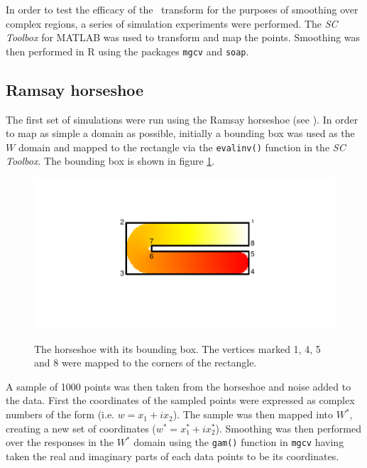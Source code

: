 In order to test the efficacy of the \sch\ transform for the purposes of smoothing over complex regions, a series of simulation experiments were performed. The \emph{SC Toolbox} for MATLAB was used to transform and map the points. Smoothing was then performed in \textsf{R} using the packages \texttt{mgcv} and \texttt{soap}.

\subsection{Ramsay horseshoe}

The first set of simulations were run using the Ramsay horseshoe (see ). In order to map as simple a domain as possible, initially a bounding box was used as the $W$ domain and mapped  to the rectangle via the \texttt{evalinv()} function in the \emph{SC Toolbox}. The bounding box is shown in figure \ref{hswithboundingbox}.

\begin{figure}
\centering
\includegraphics[trim=0.5in 1in 0in 0.5in]{sc/figs/hswithboundingbox.pdf} \\
\caption{The horseshoe with its bounding box. The vertices marked 1, 4, 5 and 8 were mapped to the corners of the rectangle.}
\label{hswithboundingbox}
\end{figure}

A sample of 1000 points was then taken from the horseshoe and noise added to the data. First the coordinates of the sampled points were expressed as complex numbers of the form (i.e. $w=x_1+ix_2$). The sample was then mapped into $W^*$, creating a new set of coordinates ($w^*=x_1^*+ix_2^*$). Smoothing was then performed over the responses in the $W^*$ domain using the \texttt{gam()} function in \texttt{mgcv} having taken the real and imaginary parts of each data points to be its coordinates. 

